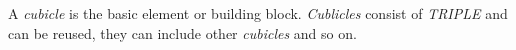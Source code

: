 \item[cubicle]{
A \emph{cubicle} is the basic element or building block. 
\emph{Cublicles} consist of \emph{TRIPLE} and can be reused, 
they can include other \emph{cubicles} and so on. 
}
